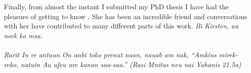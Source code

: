 \begin{refsection}
Finally, from almost the instant I submitted my PhD thesis
I have had the pleasure of getting to know .
She has been an incredible friend and conversations
with her have contributed to many different parts of this work.
\it{Bi Kirsten, au {\Q}neek ko msa{\Q}.}
\\
\\
\noindent
\it{Rarit In re{\Q} antuun On anbi {\Q}toko prenat naan, na{\Q}uab am nak,
``Amkius mirek-reko{\Q}, natuin Au u{\Q}fe{\Q}u are{\Q} kanan saa{\Q}-saa{\Q}.''}
\hfill{(Rasi Mnitas neu nai{\Q} Yohanis 21.5a)}

\end{refsection}

